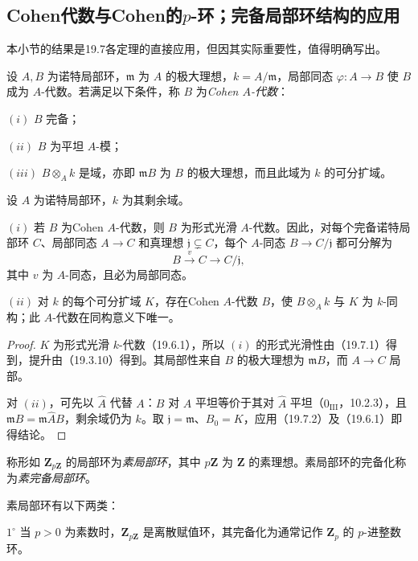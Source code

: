 \subsection{Cohen代数与Cohen的\texorpdfstring{$p$}{p}-环；完备局部环结构的应用}
本小节的结果是19.7各定理的直接应用，但因其实际重要性，值得明确写出。

设 $A,B$ 为诺特局部环，$\mathfrak m$ 为 $A$ 的极大理想，$k=A/\mathfrak m$，局部同态 $\varphi:A\to B$ 使 $B$ 成为 $A$-代数。若满足以下条件，称 $B$ 为\emph{Cohen $A$-代数}：

$(i)$ $B$ 完备；

$(ii)$ $B$ 为平坦 $A$-模；

$(iii)$ $B\otimes_Ak$ 是域，亦即 $\mathfrak mB$ 为 $B$ 的极大理想，而且此域为 $k$ 的可分扩域。

设 $A$ 为诺特局部环，$k$ 为其剩余域。

$(i)$ 若 $B$ 为Cohen $A$-代数，则 $B$ 为形式光滑 $A$-代数。因此，对每个完备诺特局部环 $C$、局部同态 $A\to C$ 和真理想 $\mathfrak j\subsetneq C$，每个 $A$-同态 $B\to C/\mathfrak j$ 都可分解为
\[
 B\xrightarrow{v}C\longrightarrow C/\mathfrak j,
\]
其中 $v$ 为 $A$-同态，且必为局部同态。

$(ii)$ 对 $k$ 的每个可分扩域 $K$，存在Cohen $A$-代数 $B$，使 $B\otimes_Ak$ 与 $K$ 为 $k$-同构；此 $A$-代数在同构意义下唯一。

\begin{proof}
$K$ 为形式光滑 $k$-代数（19.6.1），所以 $(i)$ 的形式光滑性由（19.7.1）得到，提升由（19.3.10）得到。其局部性来自 $B$ 的极大理想为 $\mathfrak mB$，而 $A\to C$ 局部。

对 $(ii)$，可先以 $\widehat A$ 代替 $A$：$B$ 对 $A$ 平坦等价于其对 $\widehat A$ 平坦（$0_{\mathrm{III}}$，10.2.3），且 $\mathfrak mB=\mathfrak m\widehat A B$，剩余域仍为 $k$。取 $\mathfrak j=\mathfrak m$、$B_0=K$，应用（19.7.2）及（19.6.1）即得结论。
\end{proof}

称形如 $\mathbf Z_{p\mathbf Z}$ 的局部环为\emph{素局部环}，其中 $p\mathbf Z$ 为 $\mathbf Z$ 的素理想。素局部环的完备化称为\emph{素完备局部环}。

素局部环有以下两类：

$1^\circ$ 当 $p>0$ 为素数时，$\mathbf Z_{p\mathbf Z}$ 是离散赋值环，其完备化为通常记作 $\mathbf Z_p$ 的 $p$-进整数环。

